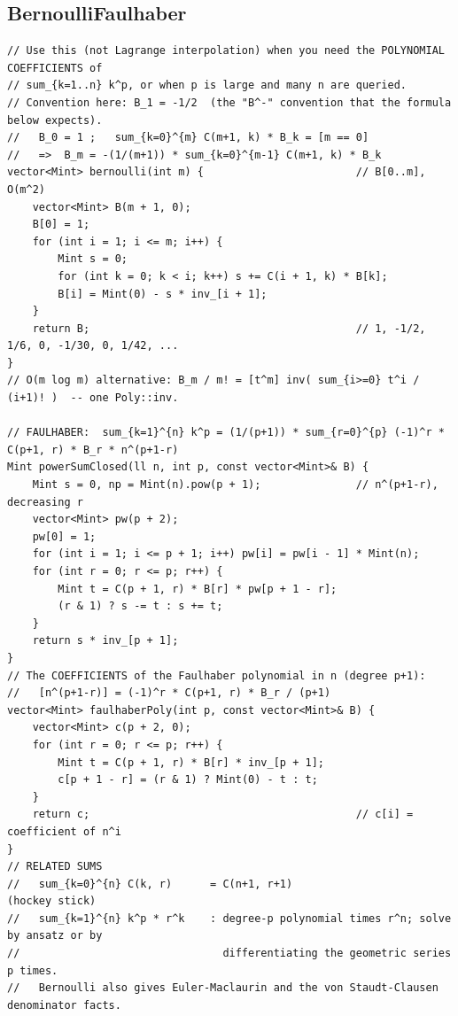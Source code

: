 \documentclass[9pt,a4paper,twocolumn]{extarticle}
\begin{document}
\filbreak
\subsection{BernoulliFaulhaber}
\nopagebreak
\begin{lstlisting}
// Use this (not Lagrange interpolation) when you need the POLYNOMIAL COEFFICIENTS of
// sum_{k=1..n} k^p, or when p is large and many n are queried.
// Convention here: B_1 = -1/2  (the "B^-" convention that the formula below expects).
//   B_0 = 1 ;   sum_{k=0}^{m} C(m+1, k) * B_k = [m == 0]
//   =>  B_m = -(1/(m+1)) * sum_{k=0}^{m-1} C(m+1, k) * B_k
vector<Mint> bernoulli(int m) {                        // B[0..m], O(m^2)
    vector<Mint> B(m + 1, 0);
    B[0] = 1;
    for (int i = 1; i <= m; i++) {
        Mint s = 0;
        for (int k = 0; k < i; k++) s += C(i + 1, k) * B[k];
        B[i] = Mint(0) - s * inv_[i + 1];
    }
    return B;                                          // 1, -1/2, 1/6, 0, -1/30, 0, 1/42, ...
}
// O(m log m) alternative: B_m / m! = [t^m] inv( sum_{i>=0} t^i / (i+1)! )  -- one Poly::inv.

// FAULHABER:  sum_{k=1}^{n} k^p = (1/(p+1)) * sum_{r=0}^{p} (-1)^r * C(p+1, r) * B_r * n^(p+1-r)
Mint powerSumClosed(ll n, int p, const vector<Mint>& B) {
    Mint s = 0, np = Mint(n).pow(p + 1);               // n^(p+1-r), decreasing r
    vector<Mint> pw(p + 2);
    pw[0] = 1;
    for (int i = 1; i <= p + 1; i++) pw[i] = pw[i - 1] * Mint(n);
    for (int r = 0; r <= p; r++) {
        Mint t = C(p + 1, r) * B[r] * pw[p + 1 - r];
        (r & 1) ? s -= t : s += t;
    }
    return s * inv_[p + 1];
}
// The COEFFICIENTS of the Faulhaber polynomial in n (degree p+1):
//   [n^(p+1-r)] = (-1)^r * C(p+1, r) * B_r / (p+1)
vector<Mint> faulhaberPoly(int p, const vector<Mint>& B) {
    vector<Mint> c(p + 2, 0);
    for (int r = 0; r <= p; r++) {
        Mint t = C(p + 1, r) * B[r] * inv_[p + 1];
        c[p + 1 - r] = (r & 1) ? Mint(0) - t : t;
    }
    return c;                                          // c[i] = coefficient of n^i
}
// RELATED SUMS
//   sum_{k=0}^{n} C(k, r)      = C(n+1, r+1)                     (hockey stick)
//   sum_{k=1}^{n} k^p * r^k    : degree-p polynomial times r^n; solve by ansatz or by
//                                differentiating the geometric series p times.
//   Bernoulli also gives Euler-Maclaurin and the von Staudt-Clausen denominator facts.
\end{lstlisting}
\end{document}
